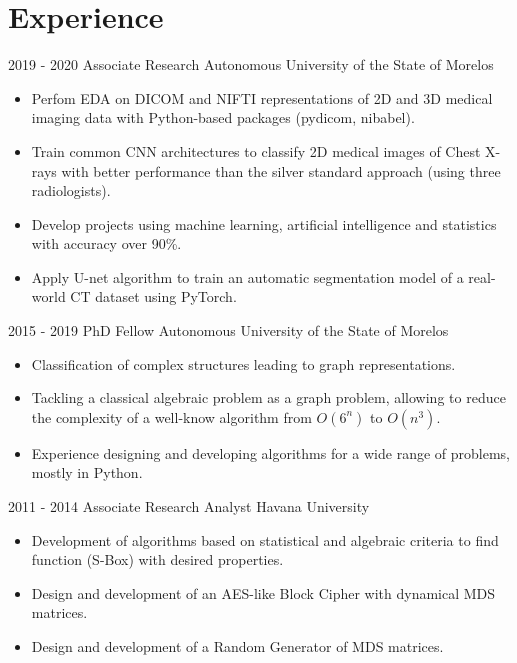 \documentclass[]{friggeri-cv}
\begin{document}
\section{Experience}
\begin{entrylist}
    \entry
    {2019 - 2020}
    {Associate Research}
    {Autonomous University of the State of Morelos}
    {\vspace{-.1in}
\begin{itemize}
\item  Perfom EDA on  DICOM and NIFTI representations of 2D and 3D medical imaging data with  Python-based  packages (pydicom, nibabel).
\item Train common CNN architectures to classify 2D medical images of Chest X-rays with better performance than the silver standard approach (using three radiologists).
\item   Develop  projects using machine learning, artificial intelligence and statistics with  accuracy over  90\%.
\item  Apply U-net algorithm to train an automatic segmentation
 model of a real-world CT dataset using PyTorch.
\end{itemize}    
   }
    \entry
    {2015 - 2019}
    {PhD Fellow}
    {Autonomous University of the State of Morelos}
    {\vspace{-.1in}
\begin{itemize}
  \item Classification of complex structures leading to graph representations.
\item Tackling a classical algebraic problem as a graph problem, allowing to reduce the complexity of a well-know algorithm from $O(6^n)$ to $O(n^3)$. 
\item  Experience designing and developing algorithms for a wide range of problems, mostly in Python.  
\end{itemize}    
   }
  \entry
    {2011 - 2014}
    { Associate Research Analyst}
    {Havana University}
    { \vspace{-.1in}
    \begin{itemize}
    \item  Development of algorithms based on statistical and algebraic criteria to find function (S-Box) with desired properties.
    \item Design and development of an AES-like  Block Cipher with dynamical MDS matrices.
    \item Design and development of a Random Generator of MDS matrices.
    \end{itemize}
 } 
\end{entrylist}\vspace*{-0.1in}
\end{document}

